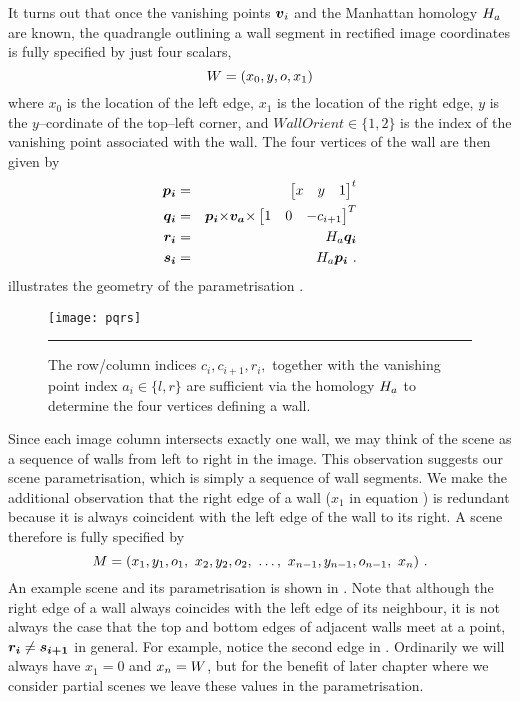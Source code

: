 It turns out that once the vanishing points $\vpt_i$ and the Manhattan
homology $\Hcf$ are known, the quadrangle outlining a wall segment in
rectified image coordinates is fully specified by just four scalars,
\begin{equation}
  \label{eq:wall-def}
  \Wall = ( x_0, y, \WallOrient, x_1 )
\end{equation}
where $x_0$ is the location of the left edge, $x_1$ is the location of
the right edge, $y$ is the $y$--cordinate of the top--left corner, and
$WallOrient\in\{1,2\}$ is the index of the vanishing point associated with
the wall. The four vertices of the wall are then given by
\begin{eqnarray}
  \label{eq:pi}
  \vect{p_i} &=& \begin{bmatrix}x&y&1\end{bmatrix}^t \\
  \label{eq:qi}
  \vect{q_i} &=& \vect{p_i}\cross\vect{v_{a}}\cross
               \begin{bmatrix}1&0&-c_{i+1}\end{bmatrix}^T\\
  \label{eq:ri}
  \vect{r_i} &=& \Hcf \vect{q_i}\\
  \label{eq:si}
  \vect{s_i} &=& \Hcf \vect{p_i} ~.
\end{eqnarray}
 illustrates the geometry of the parametrisation
.

\begin{figure}[tb]%
  \centering
  \label{fig:pqrs}
  \texttt{[image: pqrs]}
  \caption{The row/column indices $c_i,c_{i+1},r_i,$ together with
    the vanishing point index $a_i\in\{l,r\}$ are sufficient via the
    homology $\Hcf$ to determine the four vertices defining a
    wall.}
  \hrule
\end{figure}

Since each image column intersects exactly one wall, we may think of
the scene as a sequence of walls from left to right in the image. This
observation suggests our scene parametrisation, which is simply a
sequence of wall segments. We make the additional observation that the
right edge of a wall ($x_1$ in equation ) is
redundant because it is always coincident with the left edge of the
wall to its right. A scene therefore is fully specified by
\begin{equation}
  \label{eq:vertex-repr}
  \Scene =
  ( x_1,y_1,\WallOrient_1,
   ~x_2,y_2,\WallOrient_2,
   ~\ldots,
   ~x_{n-1},y_{n-1},\WallOrient_{n-1},
   ~x_n ) ~.
\end{equation}
An example scene and its parametrisation is shown in
. Note that although the right edge of a wall
always coincides with the left edge of its neighbour, it is not always
the case that the top and bottom edges of adjacent walls meet at a
point, \ie $\vect{r_i} \neq \vect{s_{i+1}}$ in general. For example,
notice the second edge in . Ordinarily we will
always have $x_1=0$ and $x_n=\Width$, but for the benefit of later
chapter where we consider partial scenes we leave these values in the
parametrisation.

